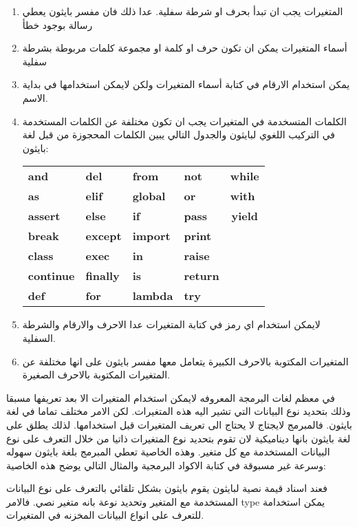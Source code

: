 \begin{enumerate}
\item
	المتغيرات يجب ان تبدأ بحرف او شرطة سفلية. عدا ذلك فان مفسر بايثون يعطي رسالة بوجود خطأ
\item
أسماء المتغيرات يمكن ان تكون حرف او كلمة او مجموعة كلمات مربوطة بشرطة سفلية	
\item
	يمكن استخدام الارقام في كتابة أسماء المتغيرات ولكن لايمكن استخدامها في بداية الاسم.
\item
	الكلمات المتسخدمة في المتغيرات يجب ان تكون مختلفة عن الكلمات المستخدمة في التركيب اللغوي لبايثون والجدول التالي يبين الكلمات المحجوزة من قبل لغة بايثون:
\begin{english}
\begin{tcolorbox}
\begin{tabular}{lllll}
\textbf{and}      & \textbf{del}     & \textbf{from}   & \textbf{not}    & \textbf{while}                     \\
\textbf{as}       & \textbf{elif}    & \textbf{global} & \textbf{or}     & \textbf{with}                      \\
\textbf{assert}   & \textbf{else}    & \textbf{if}     & \textbf{pass}   & \multicolumn{1}{c}{\textbf{yield}} \\
\textbf{break}    & \textbf{except}  & \textbf{import} & \textbf{print}  & \textbf{}                          \\
\textbf{class}    & \textbf{exec}    & \textbf{in}     & \textbf{raise}  & \textbf{}                          \\
\textbf{continue} & \textbf{finally} & \textbf{is}     & \textbf{return} & \textbf{}                          \\
\textbf{def}      & \textbf{for}     & \textbf{lambda} & \textbf{try}    & \textbf{}                         
\end{tabular}
\end{tcolorbox}
\end{english}
\item
	لايمكن استخدام اي رمز في كتابة المتغيرات عدا الاحرف والارقام والشرطة السفلية. 
\item
	المتغيرات المكتوبة بالاحرف الكبيرة يتعامل معها مفسر بايثون على انها مختلفة عن المتغيرات المكتوبة بالاحرف الصغيرة.
\end{enumerate}
في معظم لغات البرمجة المعروفه لايمكن استخدام المتغيرات الا بعد تعريفها مسبقا وذلك بتحديد نوع البيانات التي تشير اليه هذه المتغيرات. لكن الامر مختلف تماما في لغة بايثون. فالمبرمج لايجتاج لا يحتاج الى تعريف المتغيرات قبل استخدامها. لذلك يطلق على لغة بايثون بانها ديناميكية لان تقوم بتحديد نوع المتغيرات ذاتيا من خلال التعرف على نوع البيانات المستخدمة مع كل متغير. وهذه الخاصية تعطي المبرمج بلغة بايثون سهوله وسرعة غير مسبوقة في كتابة الاكواد البرمجية والمثال التالي يوضح هذه الخاصية:
\begin{english}
\end{english}
فعند اسناد قيمة نصية لبايثون يقوم بايثون بشكل تلقائي بالتعرف على نوع البيانات المستخدمة مع المتغير وتحديد نوعة بانه متغير نصي. فالامر type يمكن استخدامة للتعرف على انواع البيانات المخزنه في المتغيرات.

